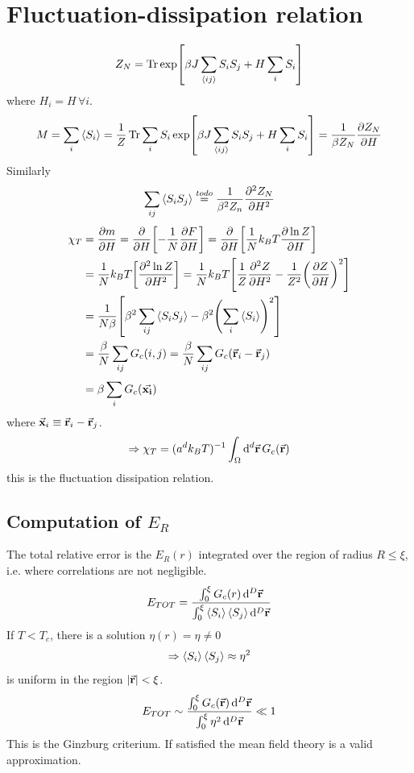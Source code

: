 \documentclass[../main/main.tex]{subfiles}
\begin{document}
\section{Fluctuation-dissipation relation}
\begin{equation}
  Z_N = \Tr \exp [ \beta J \sum_{\expval{ij} }^{} S_i S_j + H \sum_{i}^{} S_i    ]
\end{equation}
where \( H_i = H\, \forall i \).
\begin{equation}
  M = \sum_{i}^{} \expval{S_i} = \frac{1}{Z} \Tr \sum_{i}^{} S_i    \exp [ \beta J \sum_{\expval{ij} }^{} S_i S_j + H \sum_{i}^{} S_i    ] = \frac{1}{\beta Z_N} \pdv{Z_N}{H}
\end{equation}
Similarly
\begin{equation}
  \sum_{ij}^{} \expval{S_i S_j} \overset{to do}{=} \frac{1}{\beta ^2 Z_n} \pdv[2]{Z_N}{H}
\end{equation}
\begin{equation}
\begin{split}
  \chi _T & = \pdv{m}{H} = \pdv{}{H} \qty[- \frac{1}{N} \pdv{F}{H} ] = \pdv{}{H}  \qty[\frac{1}{N} k_B T \pdv{\ln{Z} }{H} ] \\
  & = \frac{1}{N} k_B T \qty[\pdv[2]{\ln{Z} }{H} ] = \frac{1}{N} k_B T \qty[\frac{1}{Z} \pdv[2]{Z}{H} - \frac{1}{Z^2} \qty(\pdv{Z}{H} )^2 ] \\
  & = \frac{1}{N \beta } \qty[\beta ^2 \sum_{ij}^{} \expval{S_i S_j}  - \beta ^2 \qty(\sum_{i}^{} \expval{S_i}  )^2   ] \\
  & = \frac{\beta }{N} \sum_{ij}^{}  G_c (i,j) = \frac{\beta }{N} \sum_{ij}^{} G_c (\va{r}_i - \va{r}_j) \\
  & = \beta \sum_{i}^{} G_c (\va{x_i})
\end{split}
\end{equation}
where \( \va{x}_i \equiv \va{r}_i - \va{r}_j \).
\begin{equation}
  \Rightarrow \chi _T = (a^d k_B T)^{-1} \int_{\Omega }^{} \dd[d]{\va{r}} G_c (\va{r})
\end{equation}
this is the fluctuation dissipation relation.
\subsection{Computation of \( E_ R  \)}
The total relative error is the \( E_R (r)\) integrated over the region of radius \( R \le \xi  \), i.e. where correlations are not negligible.
\begin{equation}
  E_{TOT} = \frac{\int_{0}^{\xi } G_c (r) \dd[D]{\va{r}}  }{\int_{0}^{\xi }\expval{S_i} \expval{S_j}  \dd[D]{\va{r}} }
\end{equation}
If \( T < T_c \), there is a solution \( \eta (r) = \eta \neq 0 \)
\begin{equation}
  \Rightarrow \expval{S_i} \expval{S_j} \approx \eta ^2
\end{equation}
is uniform in the region \( \abs{\va{r}} < \xi   \).
\begin{equation}
  E_{TOT} \sim \frac{\int_{0}^{\xi } G_c (\va{r}) \dd[D]{\va{r}}  }{\int_{0}^{\xi } \eta ^2 \dd[D]{\va{r}}  } \ll 1
  \label{eq:16_2}
\end{equation}
This is the Ginzburg criterium. If satisfied the mean field theory is a valid approximation.
\end{document}
